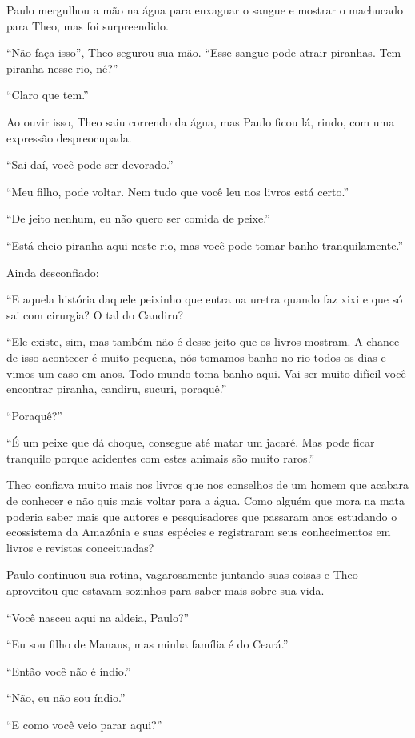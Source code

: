 Paulo mergulhou a mão na água para enxaguar o sangue e mostrar o
machucado para Theo, mas foi surpreendido.

``Não faça isso'', Theo segurou sua mão. ``Esse sangue pode atrair
piranhas. Tem piranha nesse rio, né?''

``Claro que tem.''

Ao ouvir isso, Theo saiu correndo da água, mas Paulo ficou lá, rindo,
com uma expressão despreocupada.

``Sai daí, você pode ser devorado.''

``Meu filho, pode voltar. Nem tudo que você leu nos livros está certo.''

``De jeito nenhum, eu não quero ser comida de peixe.''

``Está cheio piranha aqui neste rio, mas você pode tomar banho
tranquilamente.''

Ainda desconfiado:

``E aquela história daquele peixinho que entra na uretra quando faz xixi
e que só sai com cirurgia? O tal do Candiru?

``Ele existe, sim, mas também não é desse jeito que os livros mostram. A
chance de isso acontecer é muito pequena, nós tomamos banho no rio todos
os dias e vimos um caso em anos. Todo mundo toma banho aqui. Vai ser
muito difícil você encontrar piranha, candiru, sucuri, poraquê.''

``Poraquê?''

``É um peixe que dá choque, consegue até matar um jacaré. Mas pode ficar
tranquilo porque acidentes com estes animais são muito raros.''

Theo confiava muito mais nos livros que nos conselhos de um homem que
acabara de conhecer e não quis mais voltar para a água. Como alguém que
mora na mata poderia saber mais que autores e pesquisadores que passaram
anos estudando o ecossistema da Amazônia e suas espécies e registraram
seus conhecimentos em livros e revistas conceituadas?

Paulo continuou sua rotina, vagarosamente juntando suas coisas e Theo
aproveitou que estavam sozinhos para saber mais sobre sua vida.

``Você nasceu aqui na aldeia, Paulo?''

``Eu sou filho de Manaus, mas minha família é do Ceará.''

``Então você não é índio.''

``Não, eu não sou índio.''

``E como você veio parar aqui?''

